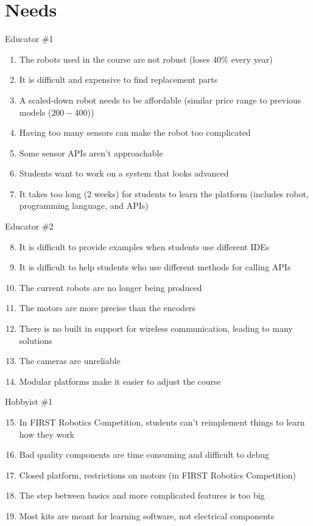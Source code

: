 \documentclass{fank1basedocument}
\begin{document}
\tableofcontents

\section*{Needs}
Educator \#1
\begin{enumerate}
	\item The robots used in the course are not robust (loses 40\% every year)
	\item It is difficult and expensive to find replacement parts
	\item A scaled-down robot needs to be affordable (similar price range to previous models ($200-$400))
	\item Having too many sensors can make the robot too complicated
	\item Some sensor APIs aren’t approachable
	\item Students want to work on a system that looks advanced
	\item It takes too long (2 weeks) for students to learn the platform (includes robot, programming language, and APIs)
\end{enumerate}
Educator \#2
\begin{enumerate}
	\setcounter{enumi}{7}
	\item It is difficult to provide examples when students use different IDEs
	\item It is difficult to help students who use different methods for calling APIs
	\item The current robots are no longer being produced
	\item The motors are more precise than the encoders
	\item There is no built in support for wireless communication, leading to many solutions
	\item The cameras are unreliable
	\item Modular platforms make it easier to adjust the course
\end{enumerate}
Hobbyist \#1
\begin{enumerate}
	\setcounter{enumi}{14}
	\item In FIRST Robotics Competition, students can’t reimplement things to learn how they work
	\item Bad quality components are time consuming and difficult to debug
	\item Closed platform, restrictions on motors (in FIRST Robotics Competition)
	\item The step between basics and more complicated features is too big
	\item Most kits are meant for learning software, not electrical components
\end{enumerate}
\end{document}
